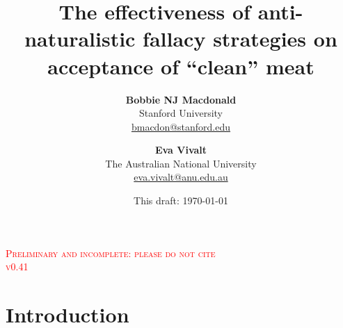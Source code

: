 \documentclass[12pt]{article}
\title{
    \vspace{-8mm}
    \Huge\selectfont\textbf{The effectiveness of anti-naturalistic fallacy strategies on acceptance of ``clean'' meat} \\[5mm] 
    \vspace{5mm}
}
\author{\textbf{Bobbie NJ Macdonald} \\
        Stanford University \\
        {\href{mailto:bmacdon@stanford.edu}{bmacdon@stanford.edu}} \\
    \and \textbf{Eva Vivalt} \\
        The Australian National University \\
        {\href{mailto:eva.vivalt@anu.edu.au}{eva.vivalt@anu.edu.au}} \\
}
\date{This draft: \today{}}
\newcommand{\todo}[1]{\textit{\textcolor{red}{$<$todo$>$ #1 $<$/todo$>$}}}
\begin{document}
\maketitle
\thispagestyle{empty}

\begin{centering}
    \Large \textsc{\textcolor{red}{Preliminary and incomplete: please do not cite}} \\
    \Large \textsc{\textcolor{red}{v0.41}} \\
    \vspace{10mm}
\end{centering}







\setcounter{page}{1}

\section{Introduction}
\label{sec:intro}

\end{document}
